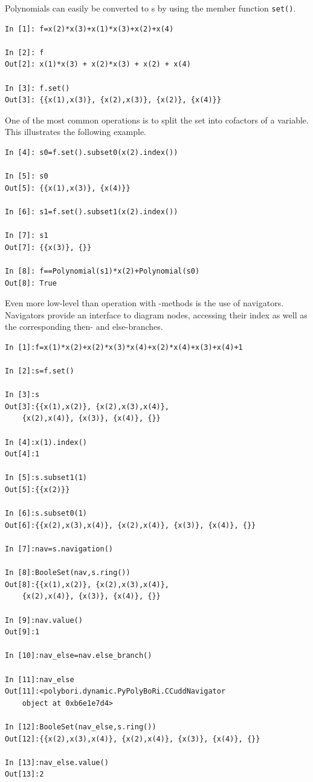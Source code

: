 Polynomials can easily be converted to s by using the
member function \lstinline|set()|.
\begin{lstlisting}
In [1]: f=x(2)*x(3)+x(1)*x(3)+x(2)+x(4)

In [2]: f
Out[2]: x(1)*x(3) + x(2)*x(3) + x(2) + x(4)

In [3]: f.set()
Out[3]: {{x(1),x(3)}, {x(2),x(3)}, {x(2)}, {x(4)}}
\end{lstlisting}
%
One of the most common operations is to split the set into cofactors of a
variable. This illustrates the following example.
%
\begin{lstlisting}
In [4]: s0=f.set().subset0(x(2).index())

In [5]: s0
Out[5]: {{x(1),x(3)}, {x(4)}}

In [6]: s1=f.set().subset1(x(2).index())

In [7]: s1
Out[7]: {{x(3)}, {}}

In [8]: f==Polynomial(s1)*x(2)+Polynomial(s0)
Out[8]: True
\end{lstlisting}
%

Even more low-level than operation with -methods is the use
of navigators. Navigators  provide an interface to diagram nodes, accessing
their index as well as the corresponding then- and else-branches.

\begin{lstlisting}
In [1]:f=x(1)*x(2)+x(2)*x(3)*x(4)+x(2)*x(4)+x(3)+x(4)+1

In [2]:s=f.set()

In [3]:s
Out[3]:{{x(1),x(2)}, {x(2),x(3),x(4)},
    {x(2),x(4)}, {x(3)}, {x(4)}, {}}

In [4]:x(1).index()
Out[4]:1

In [5]:s.subset1(1)
Out[5]:{{x(2)}}

In [6]:s.subset0(1)
Out[6]:{{x(2),x(3),x(4)}, {x(2),x(4)}, {x(3)}, {x(4)}, {}}

In [7]:nav=s.navigation()

In [8]:BooleSet(nav,s.ring())
Out[8]:{{x(1),x(2)}, {x(2),x(3),x(4)},
    {x(2),x(4)}, {x(3)}, {x(4)}, {}}

In [9]:nav.value()
Out[9]:1

In [10]:nav_else=nav.else_branch()

In [11]:nav_else
Out[11]:<polybori.dynamic.PyPolyBoRi.CCuddNavigator
    object at 0xb6e1e7d4>

In [12]:BooleSet(nav_else,s.ring())
Out[12]:{{x(2),x(3),x(4)}, {x(2),x(4)}, {x(3)}, {x(4)}, {}}

In [13]:nav_else.value()
Out[13]:2
\end{lstlisting}

